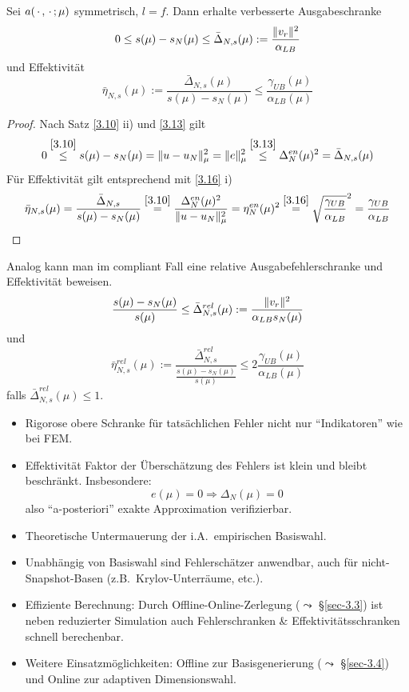\begin{satz}
	Sei $a(\,\cdot\,,\,\cdot\,;\mu)$ symmetrisch, $l=f$. Dann erhalte verbesserte Ausgabeschranke
	\[
		0 \leq s(\mu) - s_N(\mu) \leq \bar \Delta_{N,s}(\mu) := \frac{\|v_r\|^2}{\alpha_{LB}}
	\]
	und Effektivität
	\[
		\bar\eta_{N,s}(\mu) := \frac{\bar\Delta_{N,s}(\mu)}{s(\mu)-s_N(\mu)} \leq \frac{\gamma_{UB}(\mu)}{\alpha_{LB}(\mu)}
	\]

	\begin{proof}
		Nach Satz \ref{3.10} ii) und \ref{3.13} gilt
		\[
			0 \stackrel{\ref{3.10}}{\leq} s(\mu)-s_N(\mu) = \|u-u_N\|_\mu^2 = \|e\|_\mu^2 \stackrel{\ref{3.13}}{\leq} \Delta_N^{en}(\mu)^2 = \bar\Delta_{N,s}(\mu)
		\]
		Für Effektivität gilt entsprechend mit \ref{3.16} i)
		\[
			\bar\eta_{N,s}(\mu) = \frac{\bar\Delta_{N,s}}{s(\mu)-s_N(\mu)} \stackrel{\ref{3.10}}{=} \frac{\Delta_N^{en}(\mu)^2}{\|u-u_N\|_\mu^2} = \eta_N^{en}(\mu)^2 \stackrel{\ref{3.16}}{=} \sqrt{\frac{\gamma_{UB}}{\alpha_{LB}}}^2 = \frac{\gamma_{UB}}{\alpha_{LB}}
		\]
	\end{proof}
\end{satz}

\begin{bem}
	Analog kann man im compliant Fall eine relative Ausgabefehlerschranke und Effektivität beweisen.
	\[
		\frac{s(\mu)-s_N(\mu)}{s(\mu)} \leq \bar\Delta_{N,s}^{rel}(\mu) := \frac{\|v_r\|^2}{\alpha_{LB} s_N(\mu)}
	\]
	und
	\[
		\bar\eta_{N,s}^{rel}(\mu) := \frac{\bar\Delta_{N,s}^{rel}}{\frac{s(\mu)-s_N(\mu)}{s(\mu)}} \leq 2 \frac{\gamma_{UB}(\mu)}{\alpha_{LB}(\mu)}
	\]
	falls $\bar\Delta_{N,s}^{rel}(\mu) \leq 1$.
\end{bem}

\begin{bem} \beginwithlistbem
	\begin{itemize}
		\item Rigorose obere Schranke für tatsächlichen Fehler nicht nur ``Indikatoren'' wie bei FEM.
		\item Effektivität Faktor der Überschätzung des Fehlers ist klein und bleibt beschränkt.
			Insbesondere:
			\[
				e(\mu) = 0 \Rightarrow \Delta_N(\mu) = 0
			\]
			also ``a-posteriori'' exakte Approximation verifizierbar.
		\item Theoretische Untermauerung der i.A.\ empirischen Basiswahl.
		\item Unabhängig von Basiswahl sind Fehlerschätzer anwendbar, auch für nicht-Snapshot-Basen (z.B.\ Krylov-Unterräume, etc.).
		\item Effiziente Berechnung: Durch Offline-Online-Zerlegung ($\leadsto$ §\ref{sec-3.3}) ist neben reduzierter Simulation auch Fehlerschranken \& Effektivitätsschranken schnell berechenbar.
		\item Weitere Einsatzmöglichkeiten: Offline zur Basisgenerierung ($\leadsto$ §\ref{sec-3.4}) und Online zur adaptiven Dimensionswahl.
	\end{itemize}
\end{bem}

